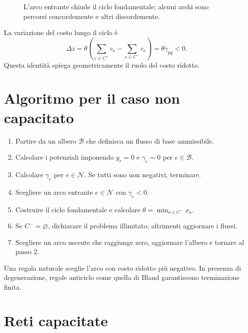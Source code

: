 \documentclass[11pt,a4paper]{article}
\newcommand{\Bset}{\mathcal{B}}
\newcommand{\Nset}{\mathcal{N}}
\begin{document}
\begin{figure}[ht]
\centering
{}
\caption{L'arco entrante chiude il ciclo fondamentale; alcuni archi sono percorsi concordemente e altri discordemente.}
\end{figure}

La variazione del costo lungo il ciclo è
\[
\Delta z=\theta\left(\sum_{e\in C^+}c_e-\sum_{e\in C^-}c_e\right)
=\theta\gamma_{pq}<0.
\]
Questa identità spiega geometricamente il ruolo del costo ridotto.

\section{Algoritmo per il caso non capacitato}

\begin{enumerate}
\item Partire da un albero $\Bset$ che definisca un flusso di base ammissibile.
\item Calcolare i potenziali imponendo $y_r=0$ e $\gamma_e=0$ per $e\in\Bset$.
\item Calcolare $\gamma_e$ per $e\in\Nset$. Se tutti sono non negativi, terminare.
\item Scegliere un arco entrante $e\in\Nset$ con $\gamma_e<0$.
\item Costruire il ciclo fondamentale e calcolare $\theta=\min_{a\in C^-}x_a$.
\item Se $C^-=\varnothing$, dichiarare il problema illimitato; altrimenti aggiornare i flussi.
\item Scegliere un arco uscente che raggiunge zero, aggiornare l'albero e tornare al passo 2.
\end{enumerate}

Una regola naturale sceglie l'arco con costo ridotto più negativo. In presenza di degenerazione, regole anticiclo come quella di Bland garantiscono terminazione finita.

\section{Reti capacitate}
\end{document}
